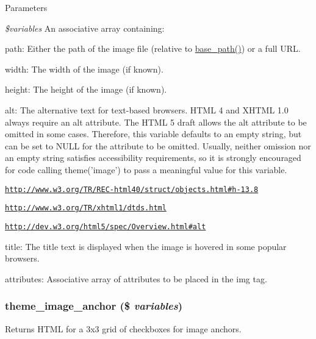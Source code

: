 \begin{DoxyParams}{Parameters}
\item[{\em \$variables}]An associative array containing:
\begin{DoxyItemize}
\item path: Either the path of the image file (relative to \hyperlink{common_8inc_ae227697e9c239f09fd7e36f71afde771}{base\_\-path()}) or a full URL.
\item width: The width of the image (if known).
\item height: The height of the image (if known).
\item alt: The alternative text for text-\/based browsers. HTML 4 and XHTML 1.0 always require an alt attribute. The HTML 5 draft allows the alt attribute to be omitted in some cases. Therefore, this variable defaults to an empty string, but can be set to NULL for the attribute to be omitted. Usually, neither omission nor an empty string satisfies accessibility requirements, so it is strongly encouraged for code calling theme('image') to pass a meaningful value for this variable.
\begin{DoxyItemize}
\item \href{http://www.w3.org/TR/REC-html40/struct/objects.html#h-13.8}{\tt http://www.w3.org/TR/REC-\/html40/struct/objects.html\#h-\/13.8}
\item \href{http://www.w3.org/TR/xhtml1/dtds.html}{\tt http://www.w3.org/TR/xhtml1/dtds.html}
\item \href{http://dev.w3.org/html5/spec/Overview.html#alt}{\tt http://dev.w3.org/html5/spec/Overview.html\#alt}
\end{DoxyItemize}
\item title: The title text is displayed when the image is hovered in some popular browsers.
\item attributes: Associative array of attributes to be placed in the img tag. 
\end{DoxyItemize}\end{DoxyParams}
\hypertarget{group__themeable_ga87233de46f3d47b3771920125165035d}{
\subsubsection[{theme\_\-image\_\-anchor}]{\setlength{\rightskip}{0pt plus 5cm}theme\_\-image\_\-anchor (\$ {\em variables})}}
\label{group__themeable_ga87233de46f3d47b3771920125165035d}
Returns HTML for a 3x3 grid of checkboxes for image anchors.


